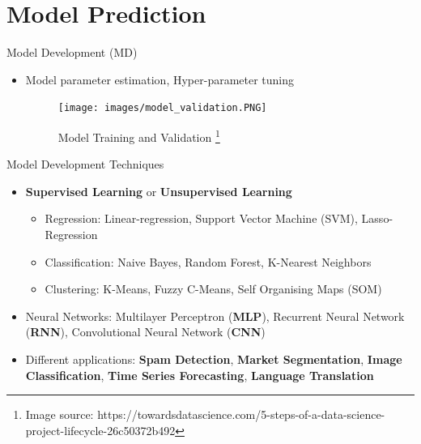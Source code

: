 \documentclass[12pt,ignorenonframetext,]{beamer}
\providecommand{\tightlist}{%
  \setlength{\itemsep}{0pt}\setlength{\parskip}{0pt}}
\begin{document}
\hypertarget{model-prediction}{%
\section{Model Prediction}\label{model-prediction}}

\begin{frame}{Model Development (MD)}
\protect\hypertarget{model-development-md}{}

\begin{itemize}
\tightlist
\item
  Model parameter estimation, Hyper-parameter tuning \vspace{2mm}

  \begin{figure}
  \texttt{[image: images/model\_validation.PNG]}
  \caption{Model Training and Validation%
    \footnote{%
     \tiny{Image source: https://towardsdatascience.com/5-steps-of-a-data-science-project-lifecycle-26c50372b492} 
    }%
  }
  \end{figure}
\end{itemize}

\end{frame}

\begin{frame}{Model Development Techniques}
\protect\hypertarget{model-development-techniques}{}

\begin{itemize}
\tightlist
\item
  \textbf{Supervised Learning} or \textbf{Unsupervised Learning}
  \vspace{2mm}

  \begin{itemize}
      \item Regression: Linear-regression, Support Vector Machine (SVM), Lasso-Regression
      \item Classification: Naive Bayes, Random Forest, K-Nearest Neighbors
      \item Clustering: K-Means, Fuzzy C-Means, Self Organising Maps (SOM) 
    \end{itemize}
  \vspace{2mm}
\item
  Neural Networks: Multilayer Perceptron (\textbf{MLP}), Recurrent
  Neural Network (\textbf{RNN}), Convolutional Neural Network
  (\textbf{CNN}) \vspace{2mm}
\item
  Different applications: \textbf{Spam Detection}, \textbf{Market
  Segmentation}, \textbf{Image Classification}, \textbf{Time Series
  Forecasting}, \textbf{Language Translation}
\end{itemize}

\end{frame}
\end{document}
